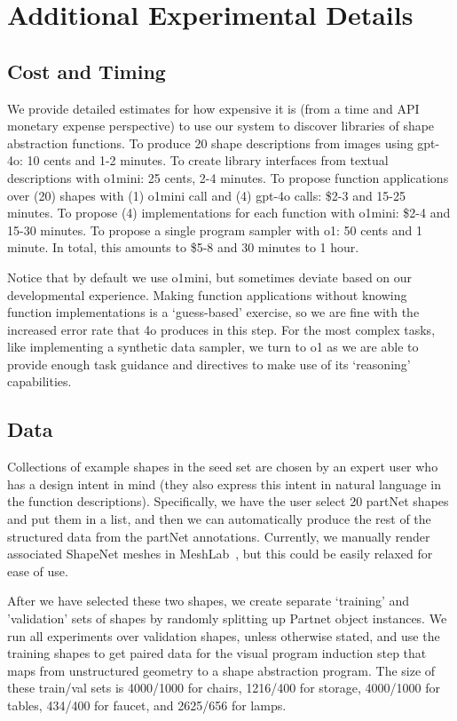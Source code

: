 \section{Additional Experimental Details  }

\subsection{Cost and Timing}

We provide detailed estimates for how expensive it is (from a time and API monetary expense perspective) to use our system to discover libraries of shape abstraction functions.
To produce 20 shape descriptions from images using gpt-4o: 10 cents and 1-2 minutes.
To create library interfaces from textual descriptions with o1mini: 25 cents, 2-4 minutes.
To propose function applications over (20) shapes with (1) o1mini call and (4) gpt-4o calls: \$2-3 
and 15-25 minutes.
To propose (4) implementations for each function with o1mini: \$2-4 and 15-30 minutes.
To propose a single program sampler with o1: 50 cents and 1 minute. In total, this amounts to \$5-8 and 30 minutes to 1 hour.

Notice that by default we use o1mini, but sometimes deviate based on our developmental experience. 
Making function applications without knowing function implementations is a `guess-based' exercise, so we are fine with the increased error rate that 4o produces in this step.
For the most complex tasks, like implementing a synthetic data sampler, we turn to o1 as we are able to provide enough task guidance and directives to make use of its `reasoning' capabilities.

\subsection{Data}

Collections of example shapes in the seed set are chosen by an expert user who has a design intent in mind (they also express this intent in natural language in the function descriptions).
Specifically, we have the user select 20 partNet shapes and put them in a list, and then we can automatically produce the rest of the structured data from the partNet annotations. 
Currently, we manually render associated ShapeNet meshes in MeshLab~\cite{meshlab}, but this could be easily relaxed for ease of use.

After we have selected these two shapes, we create separate `training' and 'validation' sets of shapes by randomly splitting up Partnet object instances.
We run all experiments over validation shapes, unless otherwise stated, and use the training shapes to get paired data for the visual program induction step that maps from unstructured geometry to a shape abstraction program.
The size of these train/val sets is 4000/1000 for chairs, 1216/400 for storage, 4000/1000 for tables, 434/400 for faucet, and 2625/656 for lamps.


